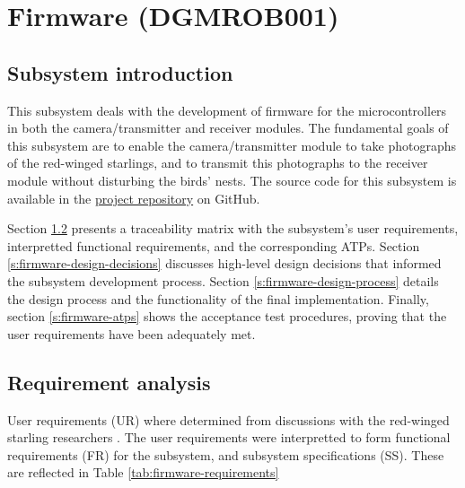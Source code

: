 \documentclass[class=report,11pt,crop=false]{standalone}
\begin{document}
\ifstandalone
\tableofcontents
\fi
\chapter{Firmware (DGMROB001) \label{ch:firmware}}
\section{Subsystem introduction}

This subsystem deals with the development of firmware for the microcontrollers in both the camera/transmitter and receiver modules. The fundamental goals of this subsystem are to enable the camera/transmitter module to take photographs of the red-winged starlings, and to transmit this photographs to the receiver module without disturbing the birds' nests. The source code for this subsystem is available in the \href{https://github.com/rothdu/EEE4113F-Group13-2024}{project repository} on GitHub.

Section \ref{s:firmware-requirements} presents a traceability matrix with the subsystem's user requirements, interpretted functional requirements, and the corresponding ATPs. Section \ref{s:firmware-design-decisions} discusses high-level design decisions that informed the subsystem development process. Section \ref{s:firmware-design-process} details the design process and the functionality of the final implementation. Finally, section \ref{s:firmware-atps} shows the acceptance test procedures, proving that the user requirements have been adequately met.

\section{Requirement analysis} \label{s:firmware-requirements}
User requirements (UR) where determined from discussions with the red-winged starling researchers \cite{hofmeyer2024private}. The user requirements were interpretted to form functional requirements (FR) for the subsystem, and subsystem specifications (SS). These are reflected in Table \ref{tab:firmware-requirements}
\end{document}
